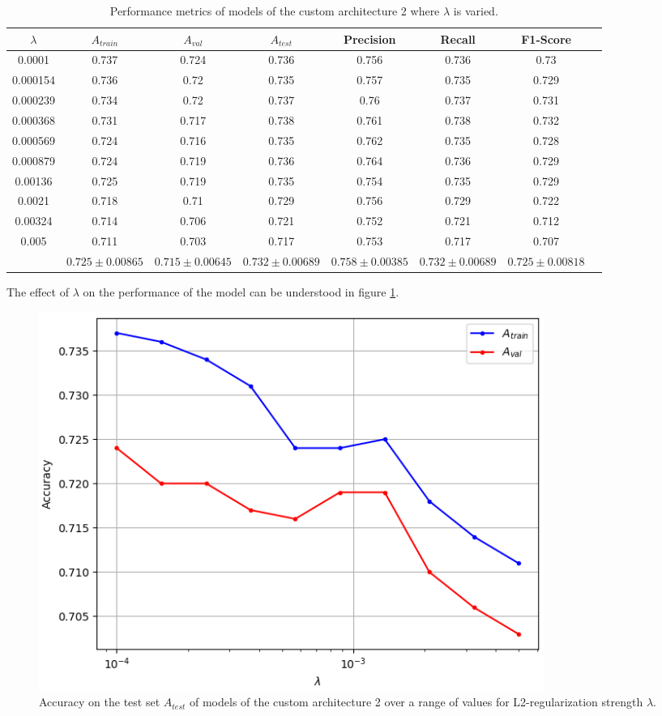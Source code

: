 \begin{table}[ht]
\centering
\begin{tabular}{ |c|c|c|c|c|c|c|c| }
\hline
$\lambda$ & $A_{train}$ & $A_{val}$ & $A_{test}$ & Precision & Recall & F1-Score \\
\hline
0.0001 & 0.737 & 0.724 & 0.736 & 0.756 & 0.736 & 0.73 \\
0.000154 & 0.736 & 0.72 & 0.735 & 0.757 & 0.735 & 0.729 \\
0.000239 & 0.734 & 0.72 & 0.737 & 0.76 & 0.737 & 0.731 \\
0.000368 & 0.731 & 0.717 & 0.738 & 0.761 & 0.738 & 0.732 \\
0.000569 & 0.724 & 0.716 & 0.735 & 0.762 & 0.735 & 0.728 \\
0.000879 & 0.724 & 0.719 & 0.736 & 0.764 & 0.736 & 0.729 \\
0.00136 & 0.725 & 0.719 & 0.735 & 0.754 & 0.735 & 0.729 \\
0.0021 & 0.718 & 0.71 & 0.729 & 0.756 & 0.729 & 0.722 \\
0.00324 & 0.714 & 0.706 & 0.721 & 0.752 & 0.721 & 0.712 \\
0.005 & 0.711 & 0.703 & 0.717 & 0.753 & 0.717 & 0.707 \\
\hline
 & $0.725\pm0.00865$ & $0.715\pm0.00645$ & $0.732\pm0.00689$ & $0.758\pm0.00385$ & $0.732\pm0.00689$ & $0.725\pm0.00818$ \\
\hline
\end{tabular}
\caption{Performance metrics of models of the custom architecture 2 where $\lambda$ is varied.}
\label{table:custom2_all}
\end{table}

The effect of $\lambda$ on the performance of the model can be understood in figure \ref{fig:custom2_lambda}.

\begin{figure}[ht]
    \centering
    \includegraphics[width=0.8\textwidth]{figs/custom2_lambda.png}
    \caption{Accuracy on the test set $A_{test}$ of models of the custom architecture 2 over a range of values for L2-regularization strength $\lambda$.}
    \label{fig:custom2_lambda}
\end{figure}

